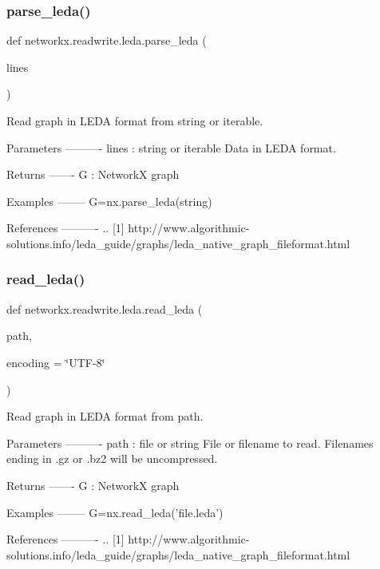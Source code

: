 \subsubsection{\texorpdfstring{parse\+\_\+leda()}{parse\_leda()}}
{\footnotesize\ttfamily def networkx.\+readwrite.\+leda.\+parse\+\_\+leda (\begin{DoxyParamCaption}\item[{}]{lines }\end{DoxyParamCaption})}

\begin{DoxyVerb}Read graph in LEDA format from string or iterable.

Parameters
----------
lines : string or iterable
   Data in LEDA format.

Returns
-------
G : NetworkX graph

Examples
--------
G=nx.parse_leda(string)

References
----------
.. [1] http://www.algorithmic-solutions.info/leda_guide/graphs/leda_native_graph_fileformat.html
\end{DoxyVerb}
 \mbox{\label{namespacenetworkx_1_1readwrite_1_1leda_ad5d909359692d23cb40dc859cdf76f2b}} 
\subsubsection{\texorpdfstring{read\+\_\+leda()}{read\_leda()}}
{\footnotesize\ttfamily def networkx.\+readwrite.\+leda.\+read\+\_\+leda (\begin{DoxyParamCaption}\item[{}]{path,  }\item[{}]{encoding = {\ttfamily \char`\"{}UTF-\/8\char`\"{}} }\end{DoxyParamCaption})}

\begin{DoxyVerb}Read graph in LEDA format from path.

Parameters
----------
path : file or string
   File or filename to read.  Filenames ending in .gz or .bz2  will be
   uncompressed.

Returns
-------
G : NetworkX graph

Examples
--------
G=nx.read_leda('file.leda')

References
----------
.. [1] http://www.algorithmic-solutions.info/leda_guide/graphs/leda_native_graph_fileformat.html
\end{DoxyVerb}
 

